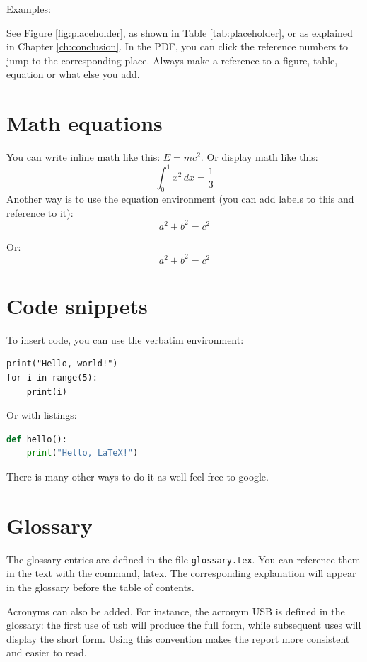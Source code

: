 Examples:

See Figure \ref{fig:placeholder},  
as shown in Table \ref{tab:placeholder},  
or as explained in Chapter \ref{ch:conclusion}.
In the PDF, you can click the reference numbers to jump to the corresponding place. Always make a reference to a figure, table, equation or what else you add.



\section*{Math equations}

You can write inline math like this: $E = mc^2$.  
Or display math like this:
\[
    \int_0^1 x^2 \, dx = \frac{1}{3}
\]
Another way is to use the equation environment (you can add labels to this and reference to it):
\begin{equation}
    a^2 + b^2 = c^2
\end{equation}

Or:
$$ a^2 + b^2 = c^2 $$



\section*{Code snippets}

To insert code, you can use the verbatim environment:
\begin{verbatim}
print("Hello, world!")
for i in range(5):
    print(i)
\end{verbatim}

Or with listings:
\begin{lstlisting}[language=Python, caption=Example Python code]
def hello():
    print("Hello, LaTeX!")
\end{lstlisting}

There is many other ways to do it as well feel free to google.


\section*{Glossary}

The glossary entries are defined in the file \texttt{glossary.tex}.  
You can reference them in the text with the command, \gls{latex}.  
The corresponding explanation will appear in the glossary before the table of contents.  

Acronyms can also be added. For instance, the acronym USB is defined in the glossary: the first use of \gls{usb} will produce the full form, while subsequent uses will display the short form. Using this convention makes the report more consistent and easier to read.


